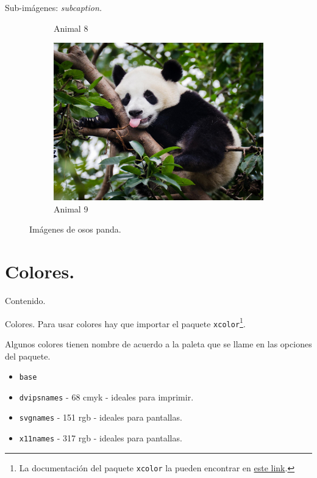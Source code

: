 \documentclass[dvipsnames,xcolor=x11names]{beamer}
\theoremstyle{plain}
\theoremstyle{definition}
\begin{document}
\begin{frame}[fragile]{Sub-imágenes: \itshape subcaption.}
\begin{figure}
\begin{subfigure}{0.4\linewidth}
    \caption{Animal 8}
    \end{subfigure}
    \begin{subfigure}{0.4\linewidth}
    \centering \includegraphics[width=0.7\linewidth]{animals/animal9.jpg}
    \caption{Animal 9}
    \end{subfigure}
    \caption{Imágenes de osos panda.}
\end{figure}
\end{frame}

\section{Colores.}
\begin{frame}{Contenido.}
  \tableofcontents[currentsection]
\end{frame}

\begin{frame}[fragile]{Colores.}
    Para usar colores hay que importar el paquete \verb!xcolor!\footnote{La documentación del paquete \verb~xcolor~ la pueden encontrar en \href{http://mirrors.ucr.ac.cr/CTAN/macros/latex/contrib/xcolor/xcolor.pdf}{\textcolor{colorClase}{este link}}.}.
    
    Algunos colores tienen nombre de acuerdo a la paleta que se llame en las opciones del paquete. 
    \begin{itemize}
        \item \verb!base!
        \item \verb!dvipsnames! - 68 cmyk - ideales para imprimir.
        \item \verb!svgnames! - 151 rgb - ideales para pantallas.
        \item \verb!x11names! - 317 rgb - ideales para pantallas.
    \end{itemize}
\end{frame}
\end{document}
